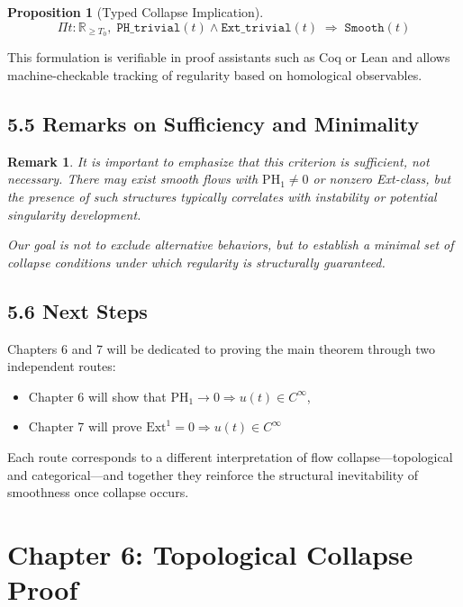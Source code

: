 \documentclass[11pt]{article}
\newtheorem{proposition}[theorem]{Proposition}
\newtheorem{remark}[theorem]{Remark}
\begin{document}
\begin{proposition}[Typed Collapse Implication]
\label{prop:typed}
\[
\Pi t : \mathbb{R}_{\ge T_0},\; \texttt{PH\_trivial}(t) \land \texttt{Ext\_trivial}(t) \;\Rightarrow\; \texttt{Smooth}(t)
\]
\end{proposition}

This formulation is verifiable in proof assistants such as Coq or Lean and allows machine-checkable tracking of regularity based on homological observables.

\subsection{5.5 Remarks on Sufficiency and Minimality}

\begin{remark}
It is important to emphasize that this criterion is \emph{sufficient}, not necessary.  
There may exist smooth flows with \( \mathrm{PH}_1 \neq 0 \) or nonzero Ext-class,  
but the presence of such structures typically correlates with instability or potential singularity development.

Our goal is not to exclude alternative behaviors, but to establish a minimal set of collapse conditions  
under which regularity is \emph{structurally guaranteed}.
\end{remark}

\subsection{5.6 Next Steps}

Chapters 6 and 7 will be dedicated to proving the main theorem through two independent routes:

\begin{itemize}
  \item Chapter 6 will show that \( \mathrm{PH}_1 \to 0 \Rightarrow u(t) \in C^\infty \),
  \item Chapter 7 will prove \( \mathrm{Ext}^1 = 0 \Rightarrow u(t) \in C^\infty \)
\end{itemize}

Each route corresponds to a different interpretation of flow collapse—topological and categorical—and together they reinforce the structural inevitability of smoothness once collapse occurs.



\section{Chapter 6: Topological Collapse Proof}
\end{document}
